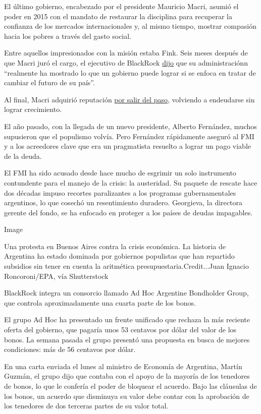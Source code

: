 El último gobierno, encabezado por el presidente Mauricio Macri, asumió
el poder en 2015 con el mandato de restaurar la disciplina para
recuperar la confianza de los mercados internacionales y, al mismo
tiempo, mostrar compasión hacia los pobres a través del gasto social.

Entre aquellos impresionados con la misión estaba Fink. Seis meses
después de que Macri juró el cargo, el ejecutivo de BlackRock
\href{https://www.youtube.com/watch?v=TM_MC2Fj-JI}{dijo} que su
administraciónn ``realmente ha mostrado lo que un gobierno puede lograr
si se enfoca en tratar de cambiar el futuro de su país''.

Al final, Macri adquirió reputación
\href{https://www.nytimes.com/es/2019/05/14/espanol/america-latina/argentina-economia-macri-kirchnerismo.html}{por
salir del paso}, volviendo a endeudarse sin lograr crecimiento.

El año pasado, con la llegada de un nuevo presidente, Alberto Fernández,
muchos supusieron que el populismo volvía. Pero Fernández rápidamente
aseguró al FMI y a los acreedores clave que era un pragmatista resuelto
a lograr un pago viable de la deuda.

El FMI ha sido acusado desde hace mucho de esgrimir un solo instrumento
contundente para el manejo de la crisis: la austeridad. Su paquete de
rescate hace dos décadas impuso recortes paralizantes a los programas
gubernamentales argentinos, lo que cosechó un resentimiento duradero.
Georgieva, la directora gerente del fondo, se ha enfocado en proteger a
los países de deudas impagables.

Image

Una protesta en Buenos Aires contra la crisis económica. La historia de
Argentina ha estado dominada por gobiernos populistas que han repartido
subsidios sin tener en cuenta la aritmética presupuestaria.Credit...Juan
Ignacio Roncoroni/EPA, vía Shutterstock

BlackRock integra un consorcio llamado Ad Hoc Argentine Bondholder
Group, que controla aproximadamente una cuarta parte de los bonos.

El grupo Ad Hoc ha presentado un frente unificado que rechaza la más
reciente oferta del gobierno, que pagaría unos 53 centavos por dólar del
valor de los bonos. La semana pasada el grupo presentó una propuesta en
busca de mejores condiciones: más de 56 centavos por dólar.

En una carta enviada el lunes al ministro de Economía de Argentina,
Martín Guzmán, el grupo dijo que contaba con el apoyo de la mayoría de
los tenedores de bonos, lo que le confería el poder de bloquear el
acuerdo. Bajo las cláusulas de los bonos, un acuerdo que disminuya su
valor debe contar con la aprobación de los tenedores de dos terceras
partes de su valor total.

